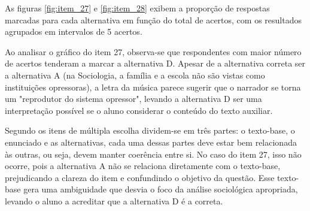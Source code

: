 \begin{comment}
	
\subsubsection{Análise dos itens com discriminação negativa}

Itens com discriminação negativa, como os analisados, não conseguem medir adequadamente a habilidade e podem gerar resultados incoerentes. Portanto, é recomendável revisá-los ou descartá-los para garantir a validade da avaliação.


\begin{figure}[!htb]
	\centering
	\caption{Curva característica dos itens com discriminação negativa.}
	\texttt{[image: ../itens\_disc\_negativa.png]}
	\parbox{\textwidth}{
		\centering %
		\makebox[16cm][l]{
			\parbox{16cm}{
				\raggedright
				\small \textbf{Fonte}: Produzido pelos autores.
			}
		}
	}
	\label{fig:itens_disc_negativa}
\end{figure}


Conforme mostrado na Figura \ref{fig:itens_disc_negativa}, a probabilidade de acerto dos participantes diminui à medida que a habilidade aumenta, ou seja, funciona de maneira contra-intuitiva. No contexto da TRI, o parâmetro b representa o nível de habilidade necessário para que um participante tenha $(c+1)/2$ de probabilidade de acertar o item. Entretanto, a presença de discriminação negativa faz com que o item funcione de maneira inversa: participantes com maior habilidade têm menor probabilidade de acerto.
\end{comment}

As figuras \ref{fig:item_27} e \ref{fig:item_28} exibem a proporção de respostas marcadas para cada alternativa em função do total de acertos, com os resultados agrupados em intervalos de 5 acertos.

Ao analisar o gráfico do item 27, observa-se que respondentes com maior número de acertos tenderam a marcar a alternativa D. Apesar de a alternativa correta ser a alternativa A (na Sociologia, a família e a escola não são vistas como instituições opressoras), a letra da música parece sugerir que o narrador se torna um "reprodutor do sistema opressor", levando a alternativa D ser uma interpretação possível se o aluno considerar o conteúdo do texto auxiliar.

Segundo  os itens de múltipla escolha dividem-se em três partes: o texto-base, o enunciado e as alternativas, cada uma dessas partes deve estar bem relacionada às outras, ou seja, devem manter coerência entre si. No caso do item 27, isso não ocorre, pois a alternativa A não se relaciona diretamente com o texto-base, prejudicando a clareza do item e confundindo o objetivo da questão. Esse texto-base gera uma ambiguidade que desvia o foco da análise sociológica apropriada, levando o aluno a acreditar que a alternativa D é a correta. 

